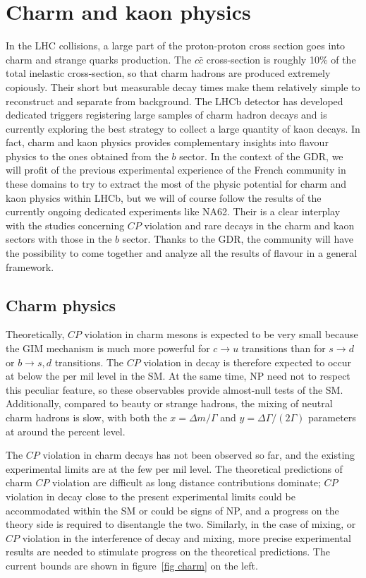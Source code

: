 
\section{Charm and kaon physics}

\label{sec:CharmAndKaon}
In the LHC collisions, a large part of the proton-proton cross section goes into charm and strange quarks production.  
The $c \bar{c}$ cross-section is roughly 10\% of the total inelastic cross-section, so that charm hadrons are produced extremely copiously. Their short but measurable decay times make them relatively simple to reconstruct and separate from background. The LHCb detector has developed dedicated triggers registering  large samples of charm hadron decays and is currently exploring the best strategy to collect a large quantity of kaon decays. In fact, charm and kaon physics provides complementary insights into flavour  physics to the ones obtained from the $b$ sector.  In the context of the GDR, we will profit of the previous experimental experience of the French community in these domains to try to extract the most of the physic potential for charm and kaon physics within LHCb, but we will of course follow the results of the currently ongoing dedicated experiments like NA62. Their is a clear interplay with the studies concerning $CP$ violation and rare decays in the charm and kaon sectors with those in the $b$ sector. Thanks to the GDR, the  community will  have the possibility to come together and analyze all the results of flavour  in a general framework. 

\subsection*{Charm physics}
 Theoretically, $CP$ violation in charm mesons is expected to be very small
because the GIM mechanism is much more powerful for $c\rightarrow u$
transitions than for $s\rightarrow d$ or $b\rightarrow s,d$ transitions. The $CP$ violation in decay is therefore expected to occur at below the per mil level in the SM.  
At the same time, NP need not to respect this peculiar feature, so these
observables provide almost-null tests of the SM.  
Additionally, compared to beauty or strange hadrons, the mixing of neutral charm hadrons is slow, with both the $x = \Delta m/\Gamma$ and $y = \Delta \Gamma/ (2\Gamma)$ parameters at around the percent level.

 The $CP$ violation in charm decays has not been observed so far, and the existing experimental limits are at the few per mil level. The theoretical predictions of charm $CP$ violation are difficult as long distance contributions dominate; $CP$ violation in decay close to the present experimental limits could be accommodated within the SM or could be signs of NP, and a progress on the theory side is required to disentangle the two. Similarly, in the case of mixing, or $CP$ violation in the interference of decay and mixing, more precise experimental results are needed to stimulate progress on the theoretical predictions. The current bounds are shown in figure~\ref{fig charm} on the left.

